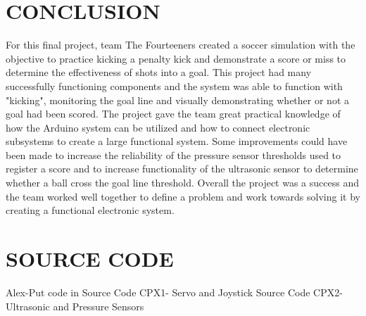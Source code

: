 \documentclass[12pt]{article}
\begin{document}
\section{CONCLUSION}
For this final project, team The Fourteeners created a soccer simulation with the objective to practice kicking a penalty kick and demonstrate a score or miss to determine the effectiveness of shots into a goal. This project had many successfully functioning components and the system was able to function with "kicking", monitoring the goal line and visually demonstrating whether or not a goal had been scored. The project gave the team great practical knowledge of how the Arduino system can be utilized and how to connect electronic subsystems to create a large functional system. Some improvements could have been made to increase the reliability of the pressure sensor thresholds used to register a score and to increase functionality of the ultrasonic sensor to determine whether a ball cross the goal line threshold. Overall the project was a success and the team worked well together to define a problem and work towards solving it by creating a functional electronic system.

\newpage



\newpage
\appendix

\section{SOURCE CODE}
Alex-Put code in
Source Code CPX1- Servo and Joystick
Source Code CPX2- Ultrasonic and Pressure Sensors

\end{document}
